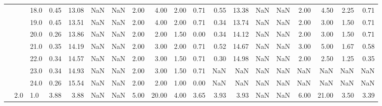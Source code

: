 \begin{tabular}{lllrrrrrrrrrrrrrrrr}
       &     & 18.0 &      0.45 &      13.08 &               NaN &                NaN & 2.00 &   4.00 &             2.00 &                         0.71 &      0.55 &      13.38 &               NaN &                NaN & 2.00 &   4.50 &             2.25 &                         0.71 \\
       &     & 19.0 &      0.45 &      13.51 &               NaN &                NaN & 2.00 &   4.00 &             2.00 &                         0.71 &      0.34 &      13.74 &               NaN &                NaN & 2.00 &   3.00 &             1.50 &                         0.71 \\
       &     & 20.0 &      0.26 &      13.86 &               NaN &                NaN & 2.00 &   2.00 &             1.50 &                         0.00 &      0.34 &      14.12 &               NaN &                NaN & 2.00 &   3.00 &             1.50 &                         0.71 \\
       &     & 21.0 &      0.35 &      14.19 &               NaN &                NaN & 2.00 &   3.00 &             2.00 &                         0.71 &      0.52 &      14.67 &               NaN &                NaN & 3.00 &   5.00 &             1.67 &                         0.58 \\
       &     & 22.0 &      0.34 &      14.57 &               NaN &                NaN & 2.00 &   3.00 &             1.50 &                         0.71 &      0.30 &      14.98 &               NaN &                NaN & 2.00 &   2.50 &             1.25 &                         0.35 \\
       &     & 23.0 &      0.34 &      14.93 &               NaN &                NaN & 2.00 &   3.00 &             1.50 &                         0.71 &       NaN &        NaN &               NaN &                NaN &  NaN &    NaN &              NaN &                          NaN \\
       &     & 24.0 &      0.26 &      15.54 &               NaN &                NaN & 2.00 &   2.00 &             1.00 &                         0.00 &       NaN &        NaN &               NaN &                NaN &  NaN &    NaN &              NaN &                          NaN \\
       & 2.0 & 1.0  &      3.88 &       3.88 &               NaN &                NaN & 5.00 &  20.00 &             4.00 &                         3.65 &      3.93 &       3.93 &               NaN &                NaN & 6.00 &  21.00 &             3.50 &                         3.39 \\

\end{tabular}
